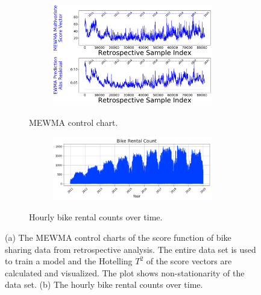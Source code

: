 \documentclass[twoside,11pt]{article}
\begin{document}
\begin{figure}[!htbp]
\centering
\begin{subfigure}[c]{0.54\linewidth}
     \centering
     \begin{subfigure}[t]{\linewidth}
     \centering
         \includegraphics[width=\textwidth, trim=0.0in 4.6in .0in .0in, clip]{../figures/v14/bike_sharing/reg_lin_cat_syr_10_tr_10/train_bike_reg_1e-08_0_0001_0_01_99_99.png}
     \end{subfigure}
     \caption{MEWMA control chart.}
     \label{fig:bs_retro}
     \end{subfigure}
\begin{subfigure}[c]{0.45\linewidth}
     \centering
     \begin{subfigure}[t]{\linewidth}
     \centering
         \includegraphics[width=\textwidth, trim=0.0in .0in .0in .0in, clip]{../figures/v14/bike_sharing/plot_cnt.png}
     \end{subfigure}
     \caption{Hourly bike rental counts over time.}
     \label{fig:bs_cnt}
\end{subfigure}
  \caption{
(a) The MEWMA control charts of the score function of bike sharing data from retrospective analysis. The entire data set is used to train a model and the Hotelling $T^2$ of the score vectors are calculated and visualized. The plot shows non-stationarity of the data set. (b) The hourly bike rental counts over time.
}
\label{fig:bike_sharing_retro}
\end{figure}
\end{document}
